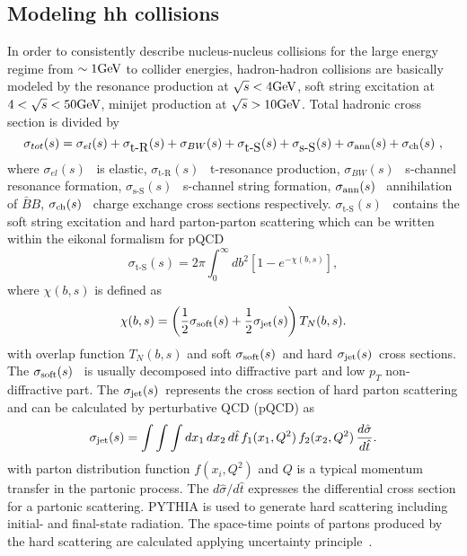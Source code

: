 \documentclass[]{article}
\newcommand{\srt}{\mbox{$\sqrt{s}$}}
\newcommand{\sigel}{\mbox{$\sigma_{el}(s)$}}
\newcommand{\sigtR}{\mbox{$\sigma_{\mbox{t-R}}(s)$}}
\newcommand{\sigtS}{\mbox{$\sigma_{\mbox{t-S}}(s)$}}
\newcommand{\sigbw}{\mbox{$\sigma_{BW}(s)$}}
\newcommand{\sigsS}{\mbox{$\sigma_{\mbox{s-S}}(s)$}}
\newcommand{\sigsoft}{\mbox{$\sigma_{{\rm soft}}(s)$}}
\newcommand{\sigjet}{\mbox{$\sigma_{{\rm jet}}(s)$}}
\newcommand{\sigann}{\mbox{$\sigma_{{\rm ann}}(s)$}}
\newcommand{\sigch}{\mbox{$\sigma_{{\rm ch}}(s)$}}
\newcommand{\Bbar}{\mbox{$\bar B$}}
\def\GeV{\mbox{\rm GeV}}
\begin{document}
\subsection{Modeling hh collisions}

In order to consistently describe nucleus-nucleus collisions
for the large energy regime from $\sim 1\GeV$ to collider energies, 
hadron-hadron collisions are basically modeled by the resonance production at
 $\srt<4\GeV$,
soft string excitation at $4<\srt<50\GeV$,
minijet production at $\srt>10\GeV$.
Total hadronic cross section is divided by
\begin{equation}
  \sigma_{tot}(s)=\sigel+\sigtR+\sigbw+\sigtS+\sigsS+\sigann+\sigch ~,
\end{equation}
where $\sigel$~ is elastic,
      $\sigtR$~ t-resonance production,
      $\sigbw$~ s-channel resonance formation,
      $\sigsS$~ s-channel string formation,
      $\sigann$~ annihilation of $\Bbar B$,
      $\sigch$~ charge exchange cross sections respectively.
$\sigtS$~ contains the soft string excitation and hard parton-parton scattering
which can be written within the eikonal formalism for pQCD~\cite{hijing}
\begin{equation}
\sigtS=2\pi\int^{\infty}_0 db^2\left[1-e^{-\chi(b,s)}\right],
\end{equation}
where $\chi(b,s)$ is defined as
\begin{equation}
  \chi(b,s)=\left({1\over2}\sigsoft+{1\over2}\sigjet\right) T_N(b,s).
\end{equation}
with overlap function $T_N(b,s)$
   and soft \sigsoft\ and hard \sigjet\ cross sections.
The \sigsoft~ is usually decomposed into diffractive part and
  low $p_T$ non-diffractive part.
The \sigjet\ represents the cross section of hard parton scattering
  and can be calculated by perturbative QCD (pQCD) as
  \begin{equation}
    \sigjet  =  \int \int \int d x_1 \, d x_2 \, d \hat{t} \,
     f_1(x_1, Q^2) \, f_2(x_2, Q^2) \, \frac{d \hat{\sigma}}{d \hat{t}}.
  \end{equation}
  with parton distribution function $f(x_i,Q^2)$ and $Q$ is
  a typical momentum transfer in the partonic process.
The $d \hat{\sigma}/d \hat{t}$ expresses the differential
cross section for a partonic scattering.
PYTHIA is used to generate hard scattering including initial- and
final-state radiation.
The space-time points of partons produced by the hard scattering 
 are calculated applying uncertainty principle~\cite{eskola1}.
\end{document}
